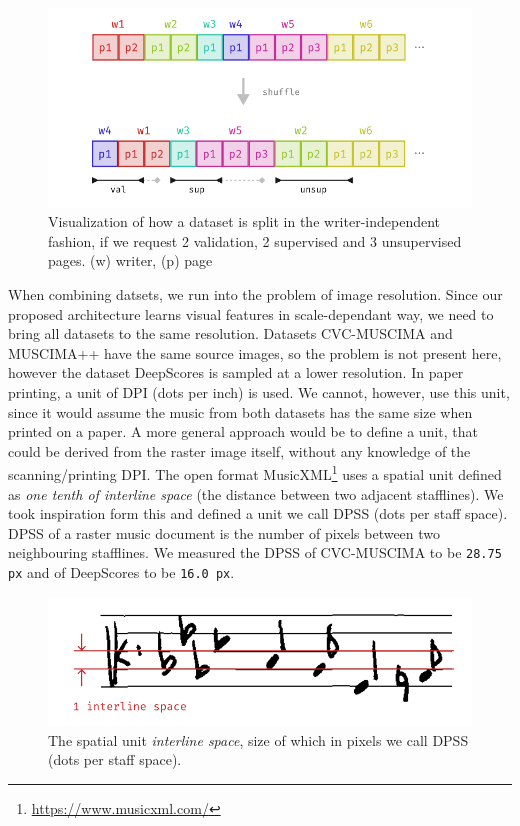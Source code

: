\begin{figure}[ht]
    \centering
    \includegraphics[width=140mm]{../img/dataset-splitting.pdf}
    \caption{Visualization of how a dataset is split in the writer-independent fashion, if we request 2 validation, 2 supervised and 3 unsupervised pages. (w) writer, (p) page}
    \label{fig:DatasetSplitting}
\end{figure}

When combining datsets, we run into the problem of image resolution. Since our proposed architecture learns visual features in scale-dependant way, we need to bring all datasets to the same resolution. Datasets CVC-MUSCIMA and MUSCIMA++ have the same source images, so the problem is not present here, however the dataset DeepScores is sampled at a lower resolution. In paper printing, a unit of DPI (dots per inch) is used. We cannot, however, use this unit, since it would assume the music from both datasets has the same size when printed on a paper. A more general approach would be to define a unit, that could be derived from the raster image itself, without any knowledge of the scanning/printing DPI. The open format MusicXML\footnote{\url{https://www.musicxml.com/}} uses a spatial unit defined as \emph{one tenth of interline space} (the distance between two adjacent stafflines). We took inspiration form this and defined a unit we call DPSS (dots per staff space). DPSS of a raster music document is the number of pixels between two neighbouring stafflines. We measured the DPSS of CVC-MUSCIMA to be \verb`28.75 px` and of DeepScores to be \verb`16.0 px`.

\begin{figure}[ht]
    \centering
    \includegraphics[width=140mm]{../img/dpss-definition.pdf}
    \caption{The spatial unit \emph{interline space}, size of which in pixels we call DPSS (dots per staff space).}
    \label{fig:DpssDefinition}
\end{figure}

